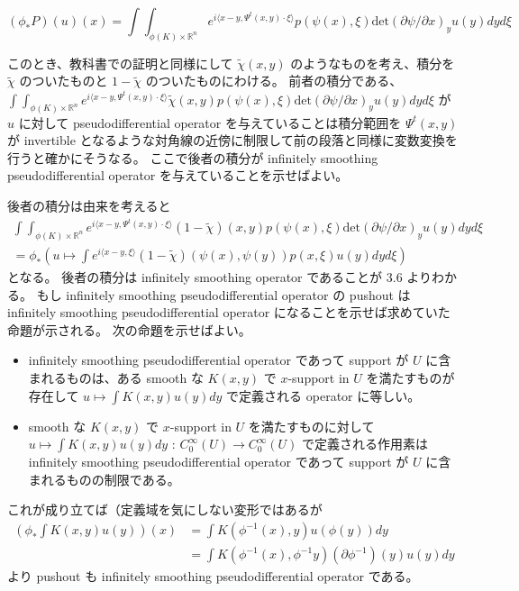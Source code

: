 \[
  (\phi_* P)(u)(x) = \int \int_{\phi(K) \times \mathbb{R}^n} e^{i \langle x - y , \Psi^t(x,y) \cdot \xi \rangle} p(\psi(x) , \xi) \text{det} (\partial \psi / \partial x)_y u(y) dy d\xi
\]

このとき、教科書での証明と同様にして \(\tilde{\chi}(x,y)\) のようなものを考え、積分を \(\tilde{\chi}\) のついたものと \(1 - \tilde{\chi}\) のついたものにわける。
前者の積分である、 \(\int \int_{\phi(K) \times \mathbb{R}^n} e^{i \langle x - y , \Psi^t(x,y) \cdot \xi \rangle} \tilde{\chi}(x,y) p(\psi(x) , \xi) \text{det} (\partial \psi / \partial x)_y u(y) dy d\xi\) が \(u\) に対して pseudodifferential operator を与えていることは積分範囲を \(\Psi^t(x,y)\) が invertible となるような対角線の近傍に制限して前の段落と同様に変数変換を行うと確かにそうなる。
ここで後者の積分が infinitely smoothing pseudodifferential operator を与えていることを示せばよい。

後者の積分は由来を考えると
\begin{align*}
  \int \int_{\phi(K) \times \mathbb{R}^n} e^{i \langle x - y , \Psi^t(x,y) \cdot \xi \rangle} (1 - \tilde{\chi})(x,y) p(\psi(x) , \xi) \text{det} (\partial \psi / \partial x)_y u(y) dy d\xi \\
  =
  \phi_* (u \mapsto \int e^{i \langle x-y , \xi \rangle} (1 - \tilde{\chi})(\psi(x) , \psi(y)) p(x,\xi)u(y) dy d\xi)
\end{align*}
となる。
後者の積分は infinitely smoothing operator であることが 3.6 よりわかる。
もし infinitely smoothing pseudodifferential operator の pushout は infinitely smoothing pseudodifferential operator になることを示せば求めていた命題が示される。
次の命題を示せばよい。
\begin{itemize}
  \item infinitely smoothing pseudodifferential operator であって support が \(U\) に含まれるものは、ある smooth な \(K(x,y)\) で \(x\)-support in \(U\) を満たすものが存在して \(u \mapsto \int K(x,y)u(y)dy\) で定義される operator に等しい。
  \item smooth な \(K(x,y)\) で \(x\)-support in \(U\) を満たすものに対して \(u \mapsto \int K(x,y)u(y)dy\) : \(C^\infty_0(U) \to C^\infty_0(U)\) で定義される作用素は infinitely smoothing pseudodifferential operator であって support が \(U\) に含まれるものの制限である。
\end{itemize}
これが成り立てば（定義域を気にしない変形ではあるが
\begin{align*}
  (\phi_* \int K(x,y)u(y))(x)
  &= \int K(\phi^{-1}(x) , y) u(\phi(y)) dy \\
  &= \int K(\phi^{-1}(x) , \phi^{-1}y) (\partial \phi^{-1})(y) u(y) dy
\end{align*}
より pushout も infinitely smoothing pseudodifferential operator である。


